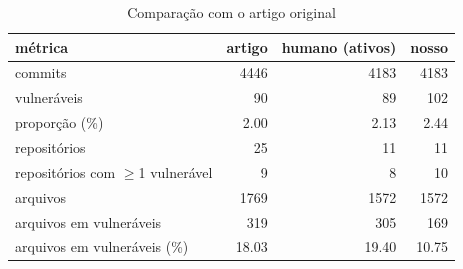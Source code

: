 \begin{table}[htbp]
\centering
\caption{Comparação com o artigo original}
\label{tab:match}
\begin{tabular}{lrrr}
\toprule
métrica & artigo & humano (ativos) & nosso \\
\midrule
commits & 4446 & 4183 & 4183 \\
vulneráveis & 90 & 89 & 102 \\
proporção (\%) & 2.00 & 2.13 & 2.44 \\
repositórios & 25 & 11 & 11 \\
repositórios com $\geq$1 vulnerável & 9 & 8 & 10 \\
arquivos & 1769 & 1572 & 1572 \\
arquivos em vulneráveis & 319 & 305 & 169 \\
arquivos em vulneráveis (\%) & 18.03 & 19.40 & 10.75 \\
\bottomrule
\end{tabular}
\end{table}
